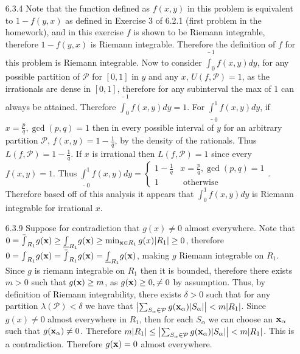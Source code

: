 \documentclass[12pt, letterpaper]{article}
\newcommand{\Po}{\mathcal{P}}
\begin{document}
\begin{enumerate}
	\item[6.3.4]	 Note that the function defined as 
	$f(x,y)$ in this problem is equivalent to $1-f(y,x)$ as defined 
	in Exercise 3 of 6.2.1 (first problem in the homework), and in 
	this exercise $f$ is shown to be Riemann integrable, therefore
	$1-f(y,x)$ is Riemann integrable.  Therefore the definition of $f$ for this problem is Riemann integrable.  Now to consider 
	$\bar{\int}_0^1 f(x,y) dy$, for any possible partition of 
	$\Po$ for $[0,1]$ in $y$ and any $x$, $U(f,\Po) = 1$, as the 
	irrationals are dense in $[0,1]$, therefore for any subinterval 
	the max of $1$ can always be attained.  Therefore 
	$\bar{\int}_0^1 f(x,y) dy = 1$.  For $\underline{\int}_0^1 f(x,y) dy$, if $x = \frac{p}{q}, \gcd(p,q) = 1$ then 
	in every possible interval of $y$ for an arbitrary partition 
	$\Po$, $f(x,y) = 1-\frac{1}{q}$, by the density of the rationals.  Thus $L(f,\Po) =1-\frac{1}{q} $.  If $x$ is irrational 
	then $L(f,\Po) = 1$ since every $f(x,y) = 1$.  Thus 
	$\underline{\int}_0^1 f(x,y) dy = \begin{cases}
	1- \frac{1}{q} & x = \frac{p}{q}, \gcd(p,q) = 1\\
	1 & \text{ otherwise}
	\end{cases}$.  
	Therefore based off of this analysis it appears that 
	$\int_0^1 f(x,y) dy$ is Riemann integrable for irrational $x$.  
	\item[6.3.9] Suppose for contradiction that 
	$g(x)\neq 0$ almost everywhere. Note that $0 = \bar{\int}_{R_1} g(\bold{x}) \geq 
	\underline{\int}_{R_1} g(\bold{x}) \geq \min_{\bold{x} \in R_1} g(x) |R_1| \geq 0$, therefore $0 = {\int}_{R_1} g(\bold{x})
	 = \bar{\int}_{R_1} g(\bold{x}) = 
	\underline{\int}_{R_1} g(\bold{x})$, making $g$ Riemann 
	integrable on $R_1$.  Since $g$ 
	is riemann integrable on $R_1$ then it is bounded, therefore 
	there exists $m > 0$ such that $g(\bold{x}) \geq m$, as $g(\bold{x}) \geq 0, \neq 0$ by assumption.  Thus, by definition 
	of Riemann integrability, there exists $\delta>0$ such 
	that for any partition $\lambda(\Po) < \delta$ we have that 
	$\left|\sum_{S_\alpha \in \Po} g(\bold{x}_\alpha) |S_\alpha| \right| < m|R_1|$.  Since $g(x) \neq 0$ almost everywhere in $R_1$, then 
	for each $S_\alpha$ we can choose an $\bold{x}_\alpha$ such that 
	$g(\bold{x}_\alpha) \neq 0$.  Therefore 
	$m|R_1| \leq \left|\sum_{S_\alpha \in \Po} g(\bold{x}_\alpha) |S_\alpha| \right| < m|R_1| $.  This is a contradiction.  Therefore 
	$g(\bold{x}) = 0$ almost everywhere.  
\end{enumerate}
\end{document}
